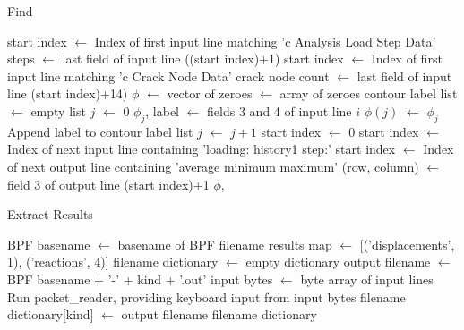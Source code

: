 \begin{algorithm}[tbp]
  \caption{Find \J}
  \label{alg:find_j}
  \begin{algorithmic}
    \State start index $\gets$ Index of first input line matching 'c  Analysis Load Step Data'
    \State steps $\gets$ last field of input line ((start index)+1)
    \State start index $\gets$ Index of first input line matching 'c  Crack Node Data'
    \State crack node count $\gets$ last field of input line (start index)+14)
    \State {}
    \State $\phi$ $\gets$ vector of zeroes 
    \State \J $\gets$ array of zeroes 
    \State \J contour label list $\gets$ empty list
    \State $j$ $\gets$ 0
      \State $\phi_j$, label $\gets$ fields 3 and 4 of input line $i$
      \State $\phi(j)$ $\gets$ $\phi_j$ 
      \State Append label to \J contour label list
      \State $j$ $\gets$ $j+1$
    \EndFor
    \State start index $\gets$ 0
      \State start index $\gets$ Index of next input line containing 'loading: history1     step:'
        \State start index $\gets$ Index of next output line containing 'average      minimum      maximum'
        \State \J(row, column) $\gets$ field 3 of output line (start index)+1
      \EndFor
    \EndFor
    \Return $\phi$, \J
    \EndProcedure
  \end{algorithmic}
\end{algorithm}

\begin{algorithm}[tbp]
  \caption{Extract Results}
  \label{alg:extract_results}
  \begin{algorithmic}
    \State BPF basename $\gets$ basename of BPF filename
    \State results map $\gets$ [('displacements', 1), ('reactions', 4)]
    \State filename dictionary $\gets$ empty dictionary
      \State output filename $\gets$ BPF basename + '-' + kind + '.out'
      \State {}
      \State {}
      \State input bytes $\gets$ byte array of input lines
      \State {}
      \State Run packet\_reader, providing keyboard input from input bytes
      \State filename dictionary[kind] $\gets$ output filename
    \EndFor
    \State \Return filename dictionary
    \EndProcedure
  \end{algorithmic}
\end{algorithm}

